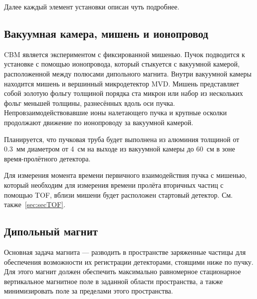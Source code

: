 Далее каждый элемент установки описан чуть подробнее.


\subsection{Вакуумная камера, мишень и ионопровод}\label{sec:secVacChamberPipe}

CBM является экспериментом с фиксированной мишенью. Пучок подводится к установке с помощью ионопровода, который стыкуется с вакуумной камерой, расположенной между полюсами дипольного магнита. Внутри вакуумной камеры находится мишень и вершинный микродетектор MVD. Мишень представляет собой золотую фольгу толщиной порядка ста микрон или набор из нескольких фольг меньшей толщины, разнесённых вдоль оси пучка. Непровзаимодействовавшие ионы налетающего пучка и крупные осколки продолжают движение по ионопроводу за вакуумной камерой.

Планируется, что пучковая труба будет выполнена из алюминия толщиной от 0.3~мм диаметром от 4~см на выходе из вакуумной камеры до 60~см в зоне время-пролётного детектора.

Для измерения момента времени первичного взаимодействия пучка с мишенью, который необходим для измерения времени пролёта вторичных частиц с помощью TOF, вблизи мишени будет расположен стартовый детектор. См. также~\ref{sec:secTOF}.


\subsection{Дипольный магнит}\label{sec:secMagnet}

Основная задача магнита --- разводить в пространстве заряженные частицы для обеспечения возможности их регистрации детекторами, стоящими ниже по пучку. Для этого магнит должен обеспечить максимально равномерное стационарное вертикальное магнитное поле в заданной области пространства, а также минимизировать поле за пределами этого пространства.

